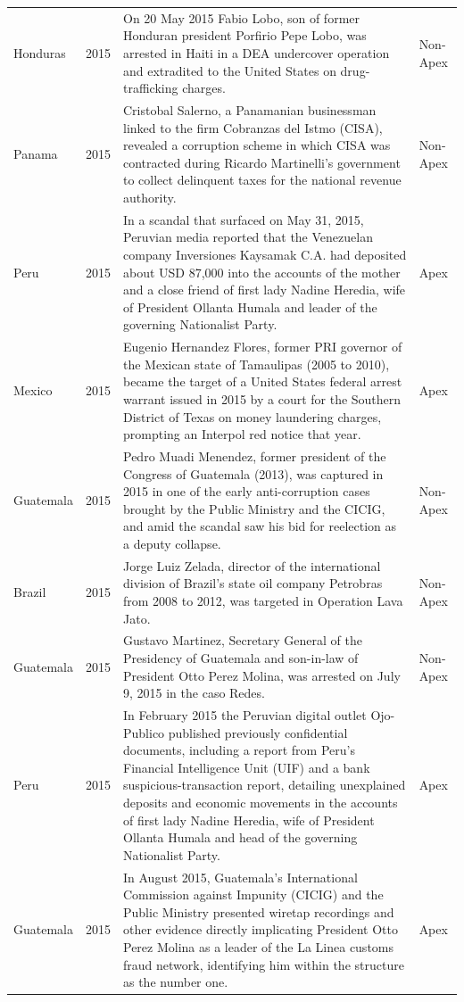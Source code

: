 \begin{landscape}
\begin{longtable}{@{}l c p{15.5cm} l@{}}
Honduras & 2015 & On 20 May 2015 Fabio Lobo, son of former Honduran president Porfirio Pepe Lobo, was arrested in Haiti in a DEA undercover operation and extradited to the United States on drug-trafficking charges. & Non-Apex \\
Panama & 2015 & Cristobal Salerno, a Panamanian businessman linked to the firm Cobranzas del Istmo (CISA), revealed a corruption scheme in which CISA was contracted during Ricardo Martinelli's government to collect delinquent taxes for the national revenue authority. & Non-Apex \\
Peru & 2015 & In a scandal that surfaced on May 31, 2015, Peruvian media reported that the Venezuelan company Inversiones Kaysamak C.A. had deposited about USD 87,000 into the accounts of the mother and a close friend of first lady Nadine Heredia, wife of President Ollanta Humala and leader of the governing Nationalist Party. & Apex \\
Mexico & 2015 & Eugenio Hernandez Flores, former PRI governor of the Mexican state of Tamaulipas (2005 to 2010), became the target of a United States federal arrest warrant issued in 2015 by a court for the Southern District of Texas on money laundering charges, prompting an Interpol red notice that year. & Apex \\
Guatemala & 2015 & Pedro Muadi Menendez, former president of the Congress of Guatemala (2013), was captured in 2015 in one of the early anti-corruption cases brought by the Public Ministry and the CICIG, and amid the scandal saw his bid for reelection as a deputy collapse. & Non-Apex \\
Brazil & 2015 & Jorge Luiz Zelada, director of the international division of Brazil's state oil company Petrobras from 2008 to 2012, was targeted in Operation Lava Jato. & Non-Apex \\
Guatemala & 2015 & Gustavo Martinez, Secretary General of the Presidency of Guatemala and son-in-law of President Otto Perez Molina, was arrested on July 9, 2015 in the caso Redes. & Non-Apex \\
Peru & 2015 & In February 2015 the Peruvian digital outlet Ojo-Publico published previously confidential documents, including a report from Peru's Financial Intelligence Unit (UIF) and a bank suspicious-transaction report, detailing unexplained deposits and economic movements in the accounts of first lady Nadine Heredia, wife of President Ollanta Humala and head of the governing Nationalist Party. & Apex \\
Guatemala & 2015 & In August 2015, Guatemala's International Commission against Impunity (CICIG) and the Public Ministry presented wiretap recordings and other evidence directly implicating President Otto Perez Molina as a leader of the La Linea customs fraud network, identifying him within the structure as the number one. & Apex \\

\end{longtable}
\end{landscape}
